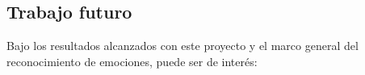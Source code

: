 \documentclass[11pt,lettersize]{article} %
\begin{document}
\begin{itemize}



\end{itemize}

\subsection{Trabajo futuro}
\label{S-trabajofuturo}

Bajo los resultados alcanzados con este proyecto y el marco general del reconocimiento de emociones, puede ser de interés:
\end{document}
